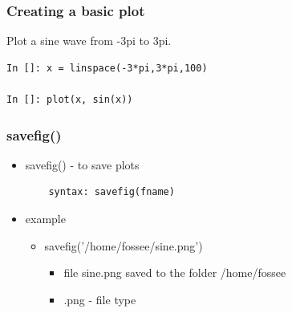 \documentclass[presentation]{beamer}
\begin{document}
\begin{frame}[fragile]
\frametitle{Creating a basic plot}
\label{sec-4}

  Plot a sine wave from -3pi to 3pi.
\lstset{language=Python}
\begin{lstlisting}
In []: x = linspace(-3*pi,3*pi,100)

In []: plot(x, sin(x))
\end{lstlisting}
\end{frame}
\begin{frame}[fragile]
\frametitle{savefig()}
\label{sec-5}
\begin{itemize}

\item savefig() - to save plots
\label{sec-5_1}%
\begin{verbatim}
    syntax: savefig(fname)
\end{verbatim}


\item example
\label{sec-5_2}%
\begin{itemize}

\item savefig('/home/fossee/sine.png')\\
\label{sec-5_2_1}%
\begin{itemize}
\item file sine.png saved to the folder /home/fossee
\item .png - file type
\end{itemize}

\end{itemize} %
\end{itemize} %
\end{frame}
\end{document}
